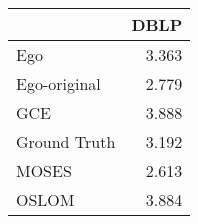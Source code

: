 \begin{tabular}{lr}
\toprule
{} &  DBLP \\
\midrule
Ego          & 3.363 \\
Ego-original & 2.779 \\
GCE          & 3.888 \\
Ground Truth & 3.192 \\
MOSES        & 2.613 \\
OSLOM        & 3.884 \\
\bottomrule
\end{tabular}
